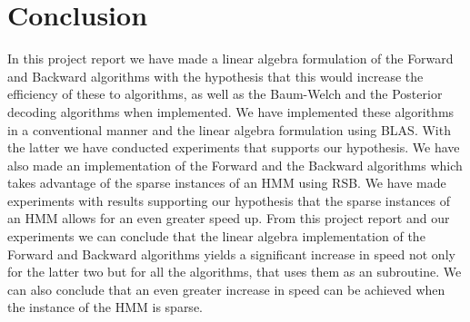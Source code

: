 \section{Conclusion}\label{sec:conclusion}


In this project report we have made a linear algebra formulation of the Forward and Backward algorithms with the hypothesis that this would increase the efficiency of these to algorithms, as well as the Baum-Welch and the Posterior decoding algorithms when implemented. We have implemented these algorithms in a conventional manner and the linear algebra formulation using BLAS. With the latter we have conducted experiments that supports our hypothesis. We have also made an implementation of the Forward and the Backward algorithms which takes advantage of the sparse instances of an HMM using RSB. We have made experiments with results supporting our hypothesis that the sparse instances of an HMM allows for an even greater speed up.
From this project report and our experiments we can conclude that the linear algebra implementation of the Forward and Backward algorithms yields a significant increase in speed not only for the latter two but for all the algorithms, that uses them as an subroutine. We can also conclude that an even greater increase in speed can be achieved when the instance of the HMM is sparse.

